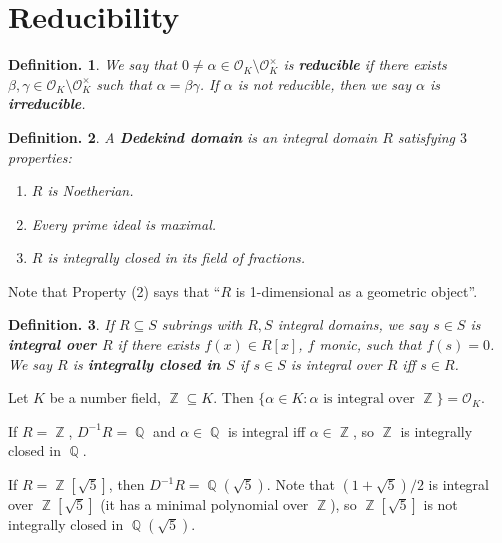 \documentclass[11pt, a4paper]{memoir}
\DeclareMathOperator{\Q}{{\mathbb{Q}}}
\DeclareMathOperator{\Z}{{\mathbb{Z}}}
\theoremstyle{change}
\theoremstyle{plain}
\theoremstyle{nonumberplain}
\newtheorem{definition}{Definition.}
\numberwithin{equation}{section}
\begin{document}
\section{Reducibility}
\begin{definition}
    We say that $0\neq\alpha\in\mathcal{O}_K\setminus \mathcal{O}_K^\times$ is \textbf{reducible} if there exists $\beta,\gamma\in\mathcal{O}_K\setminus\mathcal{O}_K^\times$ such that $\alpha=\beta\gamma$.
    If $\alpha$ is not reducible, then we say $\alpha$ is \textbf{irreducible}.
\end{definition}
\begin{definition}
    A \textbf{Dedekind domain} is an integral domain $R$ satisfying $3$ properties:
    \begin{enumerate}[nolistsep]
        \item $R$ is Noetherian.
        \item Every prime ideal is maximal.
        \item $R$ is integrally closed in its field of fractions.
    \end{enumerate}
\end{definition}
Note that Property (2) says that ``$R$ is 1-dimensional as a geometric object''.
\begin{definition}
    If $R\subseteq S$ subrings with $R,S$ integral domains, we say $s\in S$ is \textbf{integral over $R$} if there exists $f(x)\in R[x]$, $f$ monic, such that $f(s)=0$.
    We say $R$ is \textbf{integrally closed in $S$} if $s\in S$ is integral over $R$ iff $s\in R$.
\end{definition}
Let $K$ be a number field, $\Z\subseteq K$.
Then $\{\alpha\in K:\alpha\text{ is integral over }\Z\}=\mathcal{O}_K$.

If $R=\Z$, $D^{-1}R=\Q$ and $\alpha\in\Q$ is integral iff $\alpha\in\Z$, so $\Z$ is integrally closed in $\Q$.

If $R=\Z[\sqrt{5}]$, then $D^{-1}R=\Q(\sqrt{5})$.
Note that $(1+\sqrt{5})/2$ is integral over $\Z[\sqrt{5}]$ (it has a minimal polynomial over $\Z$), so $\Z[\sqrt{5}]$ is not integrally closed in $\Q(\sqrt{5})$.
\end{document}
